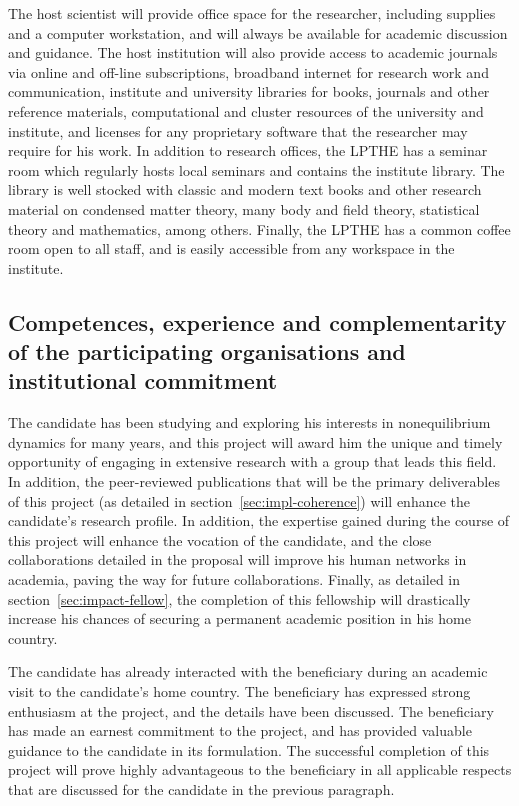\documentclass[a4paper,11pt]{article}
\begin{document}
 The host scientist will provide office space for the researcher, including supplies and a computer workstation, and will always be available for academic discussion and guidance. The host institution will also provide access to academic journals via online and off-line subscriptions, broadband internet for research work and communication, institute and university libraries for books, journals and other reference materials, computational and cluster resources of the university and institute, and licenses for any proprietary software that the researcher may require for his work. In addition to research offices, the LPTHE has a seminar room which regularly hosts local seminars and contains the institute library. The library is well stocked with classic and modern text books and other research material on condensed matter theory, many body and field theory, statistical theory and mathematics, among others. 
Finally, the LPTHE has a common coffee room open to all staff, and is easily accessible from any workspace in the institute.

\subsection{Competences, experience and complementarity of the
  participating organisations and institutional commitment}
The candidate has been studying and exploring his interests in nonequilibrium dynamics for many years, and this project will award him the unique and timely opportunity of engaging in extensive research with a group that leads this field. In addition, the peer-reviewed publications that will be the primary deliverables of this project (as detailed in section~\ref{sec:impl-coherence}) will enhance the candidate's research profile. In addition, the expertise gained during the course of this project will enhance the vocation of the candidate, and the close collaborations detailed in the proposal will improve his human networks in academia, paving the way for future collaborations. Finally, as detailed in section~\ref{sec:impact-fellow}, the completion of this fellowship will drastically increase his chances of securing a permanent academic position in his home country.

The candidate has already interacted with the beneficiary during an academic visit to the candidate's home country. The beneficiary has expressed strong enthusiasm at the project, and the details have been discussed. The beneficiary has made an earnest commitment to the project, and has provided valuable guidance to the candidate in its formulation. The successful completion of this project will prove highly advantageous to the beneficiary in all applicable respects that are discussed for the candidate in the previous paragraph.
\end{document}
